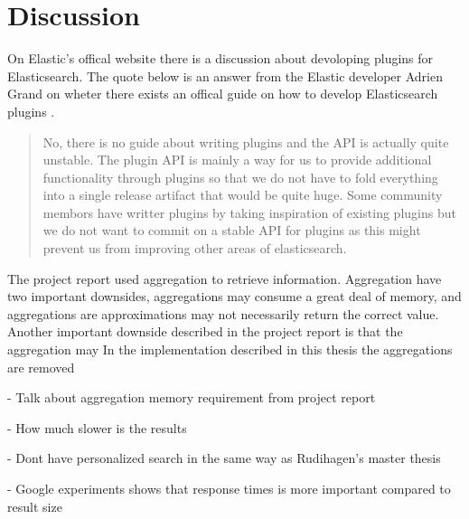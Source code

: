 \section{Discussion}
\label{sec:discussion}
On Elastic's offical website there is a discussion about devoloping plugins for Elasticsearch.
The quote below is an answer from the Elastic developer Adrien Grand on wheter there exists an offical guide on how to develop Elasticsearch plugins \cite{elasticsearch-plugin-quote}.

\begin{quote}
  No, there is no guide about writing plugins and the API is actually quite unstable.
  The plugin API is mainly a way for us to provide additional functionality through plugins so that we do not have to fold everything into a single release artifact that would be quite huge.
  Some community membors have writter plugins by taking inspiration of existing plugins but we do not want to commit on a stable API for plugins as this might prevent us from improving other areas of elasticsearch.
\end{quote}

The project report \cite{project-report} used aggregation to retrieve information.
Aggregation have two important downsides,
aggregations may consume a great deal of memory,
and aggregations are approximations may not necessarily return the correct value.
Another important downside described in the project report is that the aggregation may
In the implementation described in this thesis the aggregations are removed

- Talk about aggregation memory requirement from project report

- How much slower is the results

- Dont have personalized search in the same way as Rudihagen's master thesis

- Google experiments shows that response times is more important compared to result size
